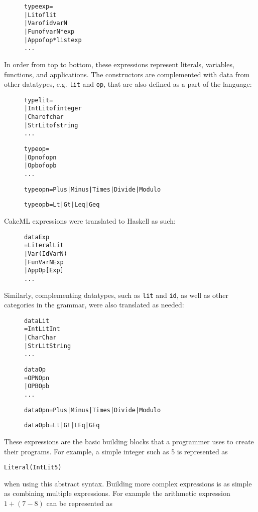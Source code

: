 \begin{figure}[H]
\begin{alltt}
  type exp =
    | Lit of lit
    | Var of id varN
    | Fun of varN * exp
    | App of op * list exp
    ...
\end{alltt}
\end{figure}

\noindent In order from top to bottom, these expressions represent literals,
variables, functions, and applications. The constructors are complemented with
data from other datatypes, e.g. \texttt{lit} and \texttt{op}, that are also
defined as a part of the language:
\begin{figure}[H]
\begin{alltt}
  type lit =
    | IntLit of integer
    | Char of char
    | StrLit of string
    ...

  type op =
    | Opn of opn
    | Opb of opb
    ...

  type opn = Plus | Minus | Times | Divide | Modulo

  type opb = Lt | Gt | Leq | Geq
\end{alltt}
\end{figure}

CakeML expressions were translated to Haskell as such:

\begin{figure}[H]
\begin{alltt}
  data Exp
    = Literal Lit
    | Var (Id VarN)
    | Fun VarN Exp
    | App Op [Exp]
    ...
\end{alltt}
\end{figure}

\noindent Similarly, complementing datatypes, such as \texttt{lit} and
\texttt{id}, as well as other categories in the grammar, were also translated
as needed:
\begin{figure}[H]
\begin{alltt}
  data Lit
    = IntLit Int
    | Char Char
    | StrLit String
    ...

  data Op
    = OPN Opn
    | OPB Opb
    ...

  data Opn = Plus | Minus | Times | Divide | Modulo

  data Opb = Lt | Gt | LEq | GEq
\end{alltt}
\end{figure}

These expressions are the basic building blocks that a programmer uses to create
their programs. For example, a simple integer such as 5 is represented as
\begin{alltt}
  Literal (IntLit 5)
\end{alltt}
when using this abstract syntax. Building more
complex expressions is as simple as combining multiple expressions. For example
the arithmetic expression \(1 + (7 - 8)\) can be represented as

